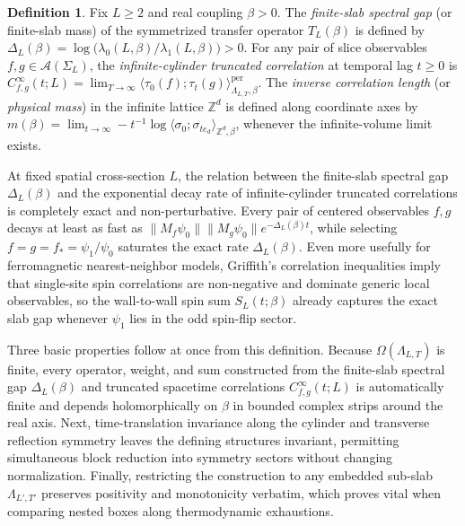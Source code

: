 \documentclass[11pt]{article}
\theoremstyle{definition}
\newtheorem{definition}[theorem]{Definition}
\begin{document}
\begin{definition}
\label{def:s08-corr-length}
Fix $L \ge 2$ and real coupling $\beta > 0$. The \emph{finite-slab spectral gap} (or
finite-slab mass) of the symmetrized transfer operator $T_L(\beta)$ is defined by
$\Delta_L(\beta) = \log\bigl(\lambda_0(L, \beta) / \lambda_1(L, \beta)\bigr) > 0$.
For any pair of slice observables $f, g \in \mathcal{A}(\Sigma_L)$, the
\emph{infinite-cylinder truncated correlation} at temporal lag $t \ge 0$ is
$C_{f,g}^\infty(t; L) = \lim_{T \to \infty} \langle \tau_0(f) ; \tau_t(g)
\rangle_{\Lambda_{L,T},\beta}^{\mathrm{per}}$. The \emph{inverse correlation length}
(or \emph{physical mass}) in the infinite lattice $\mathbb{Z}^d$ is defined along
coordinate axes by $m(\beta) = \lim_{t \to \infty} -t^{-1} \log \langle \sigma_0 ;
\sigma_{t e_d} \rangle_{\mathbb{Z}^d,\beta}$, whenever the infinite-volume limit
exists.
\end{definition}

At fixed spatial cross-section $L$, the relation between the finite-slab spectral
gap $\Delta_L(\beta)$ and the exponential decay rate of infinite-cylinder truncated
correlations is completely exact and non-perturbative. Every pair of centered
observables $f, g$ decays at least as fast as $\|M_f \psi_0\| \|M_g \psi_0\|
e^{-\Delta_L(\beta) t}$, while selecting $f = g = f_* = \psi_1 / \psi_0$ saturates
the exact rate $\Delta_L(\beta)$. Even more usefully for ferromagnetic
nearest-neighbor models, Griffith's correlation inequalities imply that single-site
spin correlations are non-negative and dominate generic local observables, so the
wall-to-wall spin sum $S_L(t; \beta)$ already captures the exact slab gap whenever
$\psi_1$ lies in the odd spin-flip sector.

Three basic properties follow at once from this definition. Because
$\Omega(\Lambda_{L,T})$ is finite, every operator, weight, and sum constructed from
the finite-slab spectral gap $\Delta_L(\beta)$ and truncated spacetime correlations
$C_{f,g}^\infty(t; L)$ is automatically finite and depends holomorphically on
$\beta$ in bounded complex strips around the real axis. Next, time-translation
invariance along the cylinder and transverse reflection symmetry leaves the defining
structures invariant, permitting simultaneous block reduction into symmetry sectors
without changing normalization. Finally, restricting the construction to any
embedded sub-slab $\Lambda_{L',T'}$ preserves positivity and monotonicity verbatim,
which proves vital when comparing nested boxes along thermodynamic exhaustions.
\end{document}
